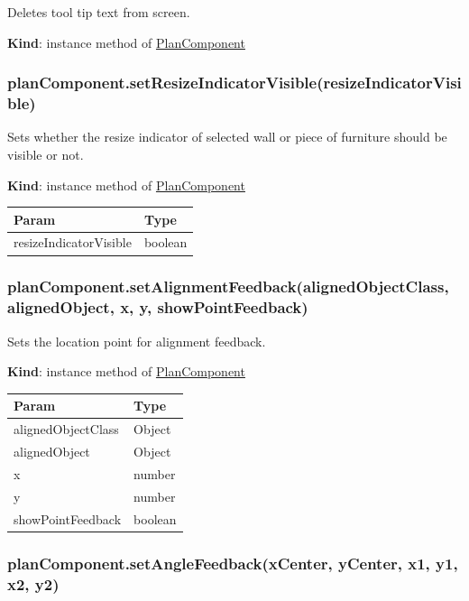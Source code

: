 \documentclass[a4paper]{report}
\begin{document}
Deletes tool tip text from screen.

\textbf{Kind}: instance method of
\protect\hyperlink{PlanComponent}{PlanComponent}\\

\hypertarget{plancomponent.setresizeindicatorvisibleresizeindicatorvisible}{%
\subsubsection{planComponent.setResizeIndicatorVisible(resizeIndicatorVisible)}\label{plancomponent.setresizeindicatorvisibleresizeindicatorvisible}}

Sets whether the resize indicator of selected wall or piece of furniture
should be visible or not.

\textbf{Kind}: instance method of
\protect\hyperlink{PlanComponent}{PlanComponent}

\begin{longtable}[]{@{}ll@{}}
\toprule
Param & Type\tabularnewline
\midrule
\endhead
resizeIndicatorVisible & boolean\tabularnewline
\bottomrule
\end{longtable}

\hypertarget{plancomponent.setalignmentfeedbackalignedobjectclass-alignedobject-x-y-showpointfeedback}{%
\subsubsection{planComponent.setAlignmentFeedback(alignedObjectClass,
alignedObject, x, y,
showPointFeedback)}\label{plancomponent.setalignmentfeedbackalignedobjectclass-alignedobject-x-y-showpointfeedback}}

Sets the location point for alignment feedback.

\textbf{Kind}: instance method of
\protect\hyperlink{PlanComponent}{PlanComponent}

\begin{longtable}[]{@{}ll@{}}
\toprule
Param & Type\tabularnewline
\midrule
\endhead
alignedObjectClass & Object\tabularnewline
alignedObject & Object\tabularnewline
x & number\tabularnewline
y & number\tabularnewline
showPointFeedback & boolean\tabularnewline
\bottomrule
\end{longtable}

\hypertarget{plancomponent.setanglefeedbackxcenter-ycenter-x1-y1-x2-y2}{%
\subsubsection{planComponent.setAngleFeedback(xCenter, yCenter, x1, y1,
x2,
y2)}\label{plancomponent.setanglefeedbackxcenter-ycenter-x1-y1-x2-y2}}
\end{document}
